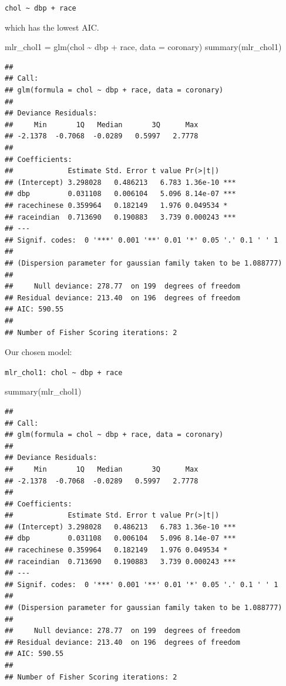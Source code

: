 \documentclass[
]{book}
\makeatletter
\newenvironment{Shaded}{\begin{snugshade}}{\end{snugshade}}
\newcommand{\AttributeTok}[1]{\textcolor[rgb]{0.61,0.61,0.61}{#1}}
\newcommand{\FunctionTok}[1]{\textcolor[rgb]{0,0,0}{#1}}
\newcommand{\NormalTok}[1]{#1}
\newcommand{\OtherTok}[1]{\textcolor[rgb]{0.37,0.37,0.37}{#1}}
\newcommand{\SpecialCharTok}[1]{\textcolor[rgb]{0,0,0}{#1}}
\renewenvironment{quote}{\begin{VF}}{\end{VF}}
\newenvironment{kframe}{%
\medskip{}
\setlength{\fboxsep}{.8em}
 \def\at@end@of@kframe{}%
 \ifinner\ifhmode%
  \def\at@end@of@kframe{\end{minipage}}%
  \begin{minipage}{\columnwidth}%
 \fi\fi%
 \def\FrameCommand##1{\hskip\@totalleftmargin \hskip-\fboxsep
 \colorbox{shadecolor}{##1}\hskip-\fboxsep
     \hskip-\linewidth \hskip-\@totalleftmargin \hskip\columnwidth}%
 \MakeFramed {\advance\hsize-\width
   \@totalleftmargin\z@ \linewidth\hsize
   \@setminipage}}%
 {\par\unskip\endMakeFramed%
 \at@end@of@kframe}
\renewenvironment{Shaded}{\begin{kframe}}{\end{kframe}}
\makeatother
\begin{document}
\begin{quote}
\texttt{chol\ \textasciitilde{}\ dbp\ +\ race}
\end{quote}

which has the lowest AIC.

\begin{Shaded}
\begin{Highlighting}[]
\NormalTok{mlr\_chol1 }\OtherTok{=} \FunctionTok{glm}\NormalTok{(chol }\SpecialCharTok{\textasciitilde{}}\NormalTok{ dbp }\SpecialCharTok{+}\NormalTok{ race, }\AttributeTok{data =}\NormalTok{ coronary)}
\FunctionTok{summary}\NormalTok{(mlr\_chol1)}
\end{Highlighting}
\end{Shaded}

\begin{verbatim}
## 
## Call:
## glm(formula = chol ~ dbp + race, data = coronary)
## 
## Deviance Residuals: 
##     Min       1Q   Median       3Q      Max  
## -2.1378  -0.7068  -0.0289   0.5997   2.7778  
## 
## Coefficients:
##             Estimate Std. Error t value Pr(>|t|)    
## (Intercept) 3.298028   0.486213   6.783 1.36e-10 ***
## dbp         0.031108   0.006104   5.096 8.14e-07 ***
## racechinese 0.359964   0.182149   1.976 0.049534 *  
## raceindian  0.713690   0.190883   3.739 0.000243 ***
## ---
## Signif. codes:  0 '***' 0.001 '**' 0.01 '*' 0.05 '.' 0.1 ' ' 1
## 
## (Dispersion parameter for gaussian family taken to be 1.088777)
## 
##     Null deviance: 278.77  on 199  degrees of freedom
## Residual deviance: 213.40  on 196  degrees of freedom
## AIC: 590.55
## 
## Number of Fisher Scoring iterations: 2
\end{verbatim}

Our chosen model:

\begin{quote}
\texttt{mlr\_chol1:\ chol\ \textasciitilde{}\ dbp\ +\ race}
\end{quote}

\begin{Shaded}
\begin{Highlighting}[]
\FunctionTok{summary}\NormalTok{(mlr\_chol1)}
\end{Highlighting}
\end{Shaded}

\begin{verbatim}
## 
## Call:
## glm(formula = chol ~ dbp + race, data = coronary)
## 
## Deviance Residuals: 
##     Min       1Q   Median       3Q      Max  
## -2.1378  -0.7068  -0.0289   0.5997   2.7778  
## 
## Coefficients:
##             Estimate Std. Error t value Pr(>|t|)    
## (Intercept) 3.298028   0.486213   6.783 1.36e-10 ***
## dbp         0.031108   0.006104   5.096 8.14e-07 ***
## racechinese 0.359964   0.182149   1.976 0.049534 *  
## raceindian  0.713690   0.190883   3.739 0.000243 ***
## ---
## Signif. codes:  0 '***' 0.001 '**' 0.01 '*' 0.05 '.' 0.1 ' ' 1
## 
## (Dispersion parameter for gaussian family taken to be 1.088777)
## 
##     Null deviance: 278.77  on 199  degrees of freedom
## Residual deviance: 213.40  on 196  degrees of freedom
## AIC: 590.55
## 
## Number of Fisher Scoring iterations: 2
\end{verbatim}
\end{document}
